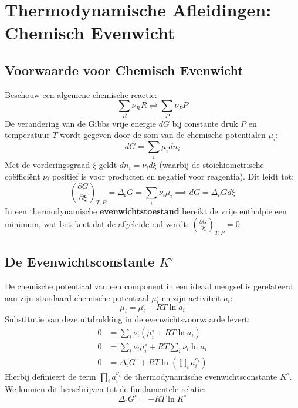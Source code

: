 \documentclass[11pt,a4paper]{article}
\begin{document}
\section{Thermodynamische Afleidingen: Chemisch Evenwicht}

\subsection{ Voorwaarde voor Chemisch Evenwicht}
Beschouw een algemene chemische reactie:
\begin{equation}
    \sum_{R} \nu_R R \rightleftharpoons \sum_{P} \nu_P P
\end{equation}
De verandering van de Gibbs vrije energie $dG$ bij constante druk $P$ en temperatuur $T$ wordt gegeven door de som van de chemische potentialen $\mu_i$:
\begin{equation}
    dG = \sum_{i} \mu_i dn_i
\end{equation}
Met de vorderingsgraad $\xi$ geldt $dn_i = \nu_i d\xi$ (waarbij de stoichiometrische coëfficiënt $\nu_i$ positief is voor producten en negatief voor reagentia). Dit leidt tot:
\begin{equation}
    \left( \frac{\partial G}{\partial \xi} \right)_{T,P} = \Delta_{\text{r}}G = \sum_{i} \nu_i \mu_i \implies dG = \Delta_r G d \xi
\end{equation}
In een thermodynamische \textbf{evenwichtstoestand } bereikt de vrije enthalpie een minimum, wat betekent dat de afgeleide nul wordt: $\left( \frac{\partial G}{\partial \xi} \right)_{T,P} = 0$.

\subsection{De Evenwichtsconstante $K^\circ$}
De chemische potentiaal van een component in een ideaal mengsel is gerelateerd aan zijn standaard chemische potentiaal $\mu_i^\circ$ en zijn activiteit $a_i$:
\begin{equation}
    \mu_i = \mu_i^\circ + RT \ln a_i
\end{equation}
Substitutie van deze uitdrukking in de evenwichtsvoorwaarde levert:
\begin{align}
    0 &= \sum_{i} \nu_i \left( \mu_i^\circ + RT \ln a_i \right) \\
    0 &= \sum_{i} \nu_i \mu_i^\circ + RT \sum_{i} \nu_i \ln a_i \\
    0 &= \Delta_{\text{r}}G^\circ + RT \ln \left( \prod_{i} a_i^{\nu_i} \right)
\end{align}
Hierbij definieert de term $\prod_{i} a_i^{\nu_i}$ de thermodynamische evenwichtsconstante $K^\circ$. We kunnen dit herschrijven tot de fundamentele relatie:
\begin{equation}
    \Delta_{\text{r}}G^\circ = -RT \ln K^\circ
\end{equation}
\end{document}
